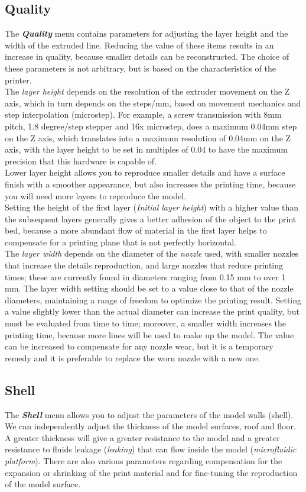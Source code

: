 \subsection{Quality}
The \emph{\textbf{Quality}} menu contains parameters for adjusting the layer height and the width of the extruded line. Reducing the value of these items results in an increase in quality, because smaller details can be reconstructed. The choice of these parameters is not arbitrary, but is based on the characteristics of the printer.\\
The \emph{layer height} depends on the resolution of the extruder movement on the Z axis, which in turn depends on the steps/mm, based on movement mechanics and step interpolation (microstep). For example, a screw transmission with 8mm pitch, 1.8 degree/step stepper and 16x microstep, does a maximum 0.04mm step on the Z axis, which translates into a maximum resolution of 0.04mm on the Z axis, with the layer height to be set in multiples of 0.04 to have the maximum precision that this hardware is capable of. \\
Lower layer height allows you to reproduce smaller details and have a surface finish with a smoother appearance, but also increases the printing time, because you will need more layers to reproduce the model.\\
Setting the height of the first layer (\emph{Initial layer height}) with a higher value than the subsequent layers generally gives a better adhesion of the object to the print bed, because a more abundant flow of material in the first layer helps to compensate for a printing plane that is not perfectly horizontal. \\
The \emph{layer width} depends on the diameter of the \emph{nozzle} used, with smaller nozzles that increase the details reproduction, and large nozzles that reduce printing times; these are currently found in diameters ranging from 0.15 mm to over 1 mm. The layer width setting should be set to a value close to that of the nozzle diameters, maintaining a range of freedom to optimize the printing result. Setting a value slightly lower than the actual diameter can increase the print quality, but must be evaluated from time to time; moreover, a smaller width increases the printing time, because more lines will be used to make up the model. The value can be increased to compensate for any nozzle wear, but it is a temporary remedy and it is preferable to replace the worn nozzle with a new one.

\subsection{Shell}
The \emph{\textbf{Shell}} menu allows you to adjust the parameters of the model walls (shell). We can independently adjust the thickness of the model surfaces, roof and floor. A greater thickness will give a greater resistance to the model and a greater resistance to fluids leakage (\emph{leaking}) that can flow inside the model (\emph{microfluidic platform}). There are also various parameters regarding compensation for the expansion or shrinking of the print material and for fine-tuning the reproduction of the model surface.

